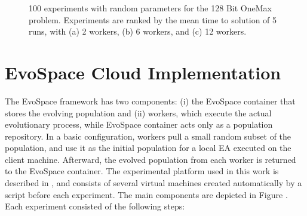\documentclass{llncs}
\begin{document}
\begin{figure}[t]
    \centering

    \caption{100 experiments with random parameters for the 128 Bit OneMax problem.
    Experiments are ranked by the mean time to solution of 5 runs, with   
    (a) 2 workers, (b) 6 workers, and (c) 12 workers.}
    \label{fig:effort}
\end{figure}


\section{EvoSpace Cloud Implementation}
\label{sec:evo}
The EvoSpace \cite{GValdez2015} framework has two components: (i) the EvoSpace 
container that stores the evolving population and (ii) workers, which execute 
the actual evolutionary process, while EvoSpace container acts only as a population repository.
In a basic configuration, workers pull a small random subset of the 
population, and use it as the initial population for a local EA executed 
on the client machine. Afterward, the evolved population from each worker 
is returned to the EvoSpace container. The experimental platform used in this work is
described in \cite{valenzuela2015implementing}, and consists of several virtual machines
created automatically by a script before each experiment. The main components are depicted
in Figure \cite{fig:evospace}. Each experiment consisted of the following steps:
\end{document}
